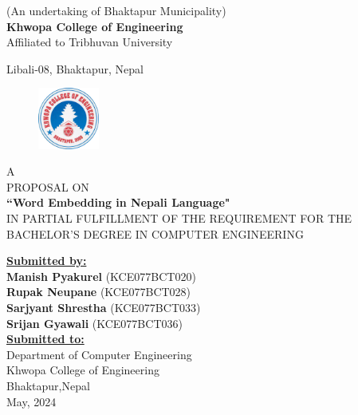 \begin{center}
	\thispagestyle{empty}
	 \normalsize(An undertaking of Bhaktapur Municipality)\\
	 \Large\textbf{Khwopa College of Engineering}\\
	 \normalsize Affiliated to Tribhuvan University\\
	\normalsize{{{Libali-08, Bhaktapur, Nepal}}\\[0.75cm]

	\begin{figure}[h!]
		\centering
			\includegraphics[width=0.18\textwidth]{img/khwopa logo hd.png}
	\end{figure}
	\large{A \\PROPOSAL ON\\\textbf{``Word Embedding in Nepali Language"}}\\\vspace{0.1in}
	 \normalsize{IN PARTIAL FULFILLMENT OF THE REQUIREMENT
FOR THE BACHELOR’S DEGREE IN COMPUTER ENGINEERING} \\[0.65cm]
 
\vspace*{1cm}
	
	\large\textbf{\underline{Submitted by:}}\\
	
{\bf Manish Pyakurel} (KCE077BCT020)\\
{\bf Rupak Neupane} (KCE077BCT028)\\
{\bf Sarjyant Shrestha} (KCE077BCT033)\\
{\bf Srijan Gyawali} (KCE077BCT036)\\[0.75cm]

	\large\textbf{\underline{Submitted to:}}\\

\large Department of Computer Engineering\\
\large Khwopa College of Engineering\\
\large Bhaktapur,Nepal\\[0.75cm]
\large{May, 2024}
}
\end{center}